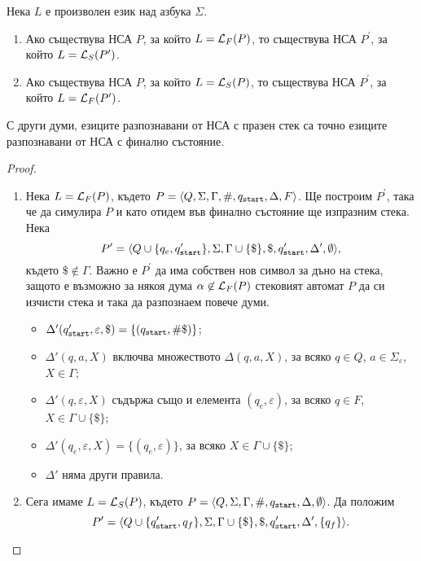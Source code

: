 \begin{thm}
  Нека $L$ е произволен език над азбука $\Sigma$.
  \begin{enumerate}[1)]
  \item 
    Ако съществува НСА $P$, за който $L = \mathcal{L}_F(P)$, то съществува НСА $P^\prime$, за който $L = \mathcal{L}_S(P^\prime)$.
  \item
    Ако съществува НСА $P$, за който $L = \mathcal{L}_S(P)$, то съществува НСА $P^\prime$, за който $L = \mathcal{L}_F(P^\prime)$.
  \end{enumerate}
  С други думи, езиците разпознавани от НСА с празен стек са точно езиците разпознавани от НСА с финално състояние.
\end{thm}
\begin{proof}
  \begin{enumerate}[1)]
  \item 
    Нека $L = \mathcal{L}_F(P)$, където $P = \langle{Q,\Sigma,\Gamma,\#,q_{\texttt{start}},\Delta,F}\rangle$.
    Ще построим $P^\prime$, така че да симулира $P$ и като отидем във финално състояние ще изпразним стека.
    Нека
    \[P^\prime = \langle{Q\cup\{q_e,q_{\texttt{start}}'\},\Sigma,\Gamma \cup \{\$\},\$,q_{\texttt{start}}',\Delta^\prime,\emptyset}\rangle,\]
    където $\$ \not\in \Gamma$.
    Важно е $P^\prime$ да има собствен нов символ за дъно на стека, защото е възможно за някоя дума $\alpha \not\in \mathcal{L}_F(P)$
    стековият автомат $P$ да си изчисти стека и така да разпознаем повече думи.
    \begin{itemize}
    \item 
      $\Delta'(q_{\texttt{start}}',\varepsilon,\$) = \{(q_{\texttt{start}},\#\$)\}$;
    \item
      $\Delta'(q,a,X)$ включва множеството $\Delta(q,a,X)$, за всяко $q\in Q$, $a\in\Sigma_\varepsilon$, $X\in\Gamma$;
    \item
      $\Delta'(q,\varepsilon,X)$ съдържа също и елемента $(q_e,\varepsilon)$, за всяко $q\in F$, $X \in \Gamma \cup \{\$\}$;
    \item
      $\Delta'(q_e,\varepsilon,X) = \{(q_e,\varepsilon)\}$, за всяко $X \in \Gamma \cup \{\$\}$;
    \item
      $\Delta'$ няма други правила.
    \end{itemize}
  \item
    Сега имаме $L = \mathcal{L}_S(P)$, където $P = \langle{Q,\Sigma,\Gamma,\#,q_{\texttt{start}},\Delta,\emptyset}\rangle$. 
    Да положим
    \[P^\prime = \langle{Q\cup\{q_{\texttt{start}}',q_f\}, \Sigma, \Gamma \cup \{\$\}, \$, q_{\texttt{start}}', \Delta^\prime, \{q_f\}}\rangle.\]

\end{enumerate}
\end{proof}
